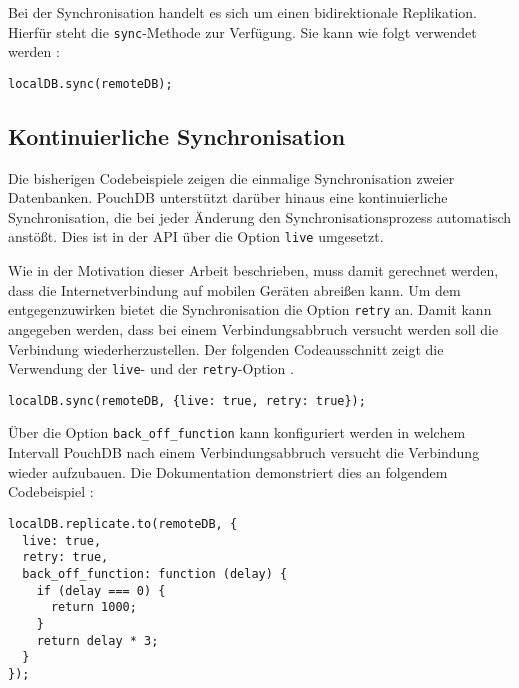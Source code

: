 Bei der Synchronisation handelt es sich um einen bidirektionale Replikation. Hierfür steht die \texttt{sync}-Methode zur Verfügung. Sie kann wie folgt verwendet werden \cite{pouch:replication}:
\begin{codebox}
\begin{lstlisting}[style=typescript]
localDB.sync(remoteDB);
\end{lstlisting}
\end{codebox}

\subsection{Kontinuierliche Synchronisation}
Die bisherigen Codebeispiele zeigen die einmalige Synchronisation zweier Datenbanken. PouchDB unterstützt darüber hinaus eine kontinuierliche Synchronisation, die bei jeder Änderung den Synchronisationsprozess automatisch anstößt. Dies ist in der API über die Option \texttt{live} umgesetzt.

Wie in der Motivation dieser Arbeit beschrieben, muss damit gerechnet werden, dass die Internetverbindung auf mobilen Geräten abreißen kann. Um dem entgegenzuwirken bietet die Synchronisation die Option \texttt{retry} an. Damit kann angegeben werden, dass bei einem Verbindungsabbruch versucht werden soll die Verbindung wiederherzustellen. Der folgenden Codeausschnitt zeigt die Verwendung der \texttt{live}- und der \texttt{retry}-Option \cite{pouch:replication}.
\begin{codebox}
\begin{lstlisting}[style=typescript]
localDB.sync(remoteDB, {live: true, retry: true});
\end{lstlisting}
\end{codebox}

Über die Option \texttt{back\_off\_function} kann konfiguriert werden in welchem Intervall PouchDB nach einem Verbindungsabbruch versucht die Verbindung wieder aufzubauen. Die Dokumentation demonstriert dies an folgendem Codebeispiel \cite{pouch:api}:

\begin{codebox}
\begin{lstlisting}[style=typescript]
localDB.replicate.to(remoteDB, {
  live: true,
  retry: true,
  back_off_function: function (delay) {
    if (delay === 0) {
      return 1000;
    }
    return delay * 3;
  }
});
\end{lstlisting}
\end{codebox}

